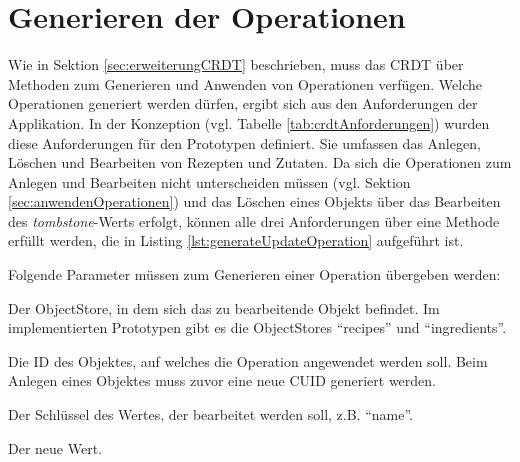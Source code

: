 \documentclass[a4paper, 12pt]{scrreprt}
\begin{document}
\begin{minipage}{\linewidth}
	
\end{minipage}

\section{Generieren der Operationen}

Wie in Sektion \ref{sec:erweiterungCRDT} beschrieben, muss das CRDT über Methoden zum Generieren und Anwenden von Operationen verfügen. Welche Operationen generiert werden dürfen, ergibt sich aus den Anforderungen der Applikation. In der Konzeption (vgl. Tabelle \ref{tab:crdtAnforderungen}) wurden diese Anforderungen für den Prototypen definiert. Sie umfassen das Anlegen, Löschen und Bearbeiten von Rezepten und Zutaten. Da sich die Operationen zum Anlegen und Bearbeiten nicht unterscheiden müssen (vgl. Sektion \ref{sec:anwendenOperationen}) und das Löschen eines Objekts über das Bearbeiten des \textit{tombstone}-Werts erfolgt, können alle drei Anforderungen über eine Methode erfüllt werden, die in Listing \ref{lst:generateUpdateOperation} aufgeführt ist. 

\begin{minipage}{\linewidth}
	
\end{minipage}

Folgende Parameter müssen zum Generieren einer Operation übergeben werden: 
\begin{description}[leftmargin=!,labelwidth=\widthof{\bfseries store: }]
	\item [\textit{store:} ] Der ObjectStore, in dem sich das zu bearbeitende Objekt befindet. Im implementierten Prototypen gibt es die ObjectStores \enquote{recipes} und \enquote{ingredients}.
	\item [\textit{Id:} ] Die ID des Objektes, auf welches die Operation angewendet werden soll. Beim Anlegen eines Objektes muss zuvor eine neue CUID generiert werden.
	\item [\textit{key:} ] Der Schlüssel des Wertes, der bearbeitet werden soll, z.B. \enquote{name}.
	\item [\textit{value:} ] Der neue Wert.
\end{description}
\end{document}
